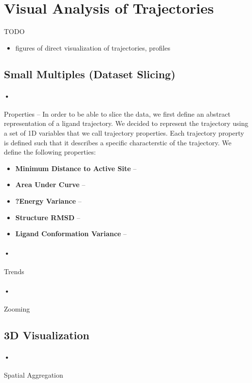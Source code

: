 \documentclass{vgtc}                          %
\begin{document}
\section{Visual Analysis of Trajectories}

TODO
\begin{itemize}
  \item figures of direct visualization of trajectories, profiles
\end{itemize}

\subsection{Small Multiples (Dataset Slicing)}

\paragraph{•} Properties -- In order to be able to slice the data, we first define an abstract representation of a ligand trajectory.
We decided to represent the trajectory using a set of 1D variables that we call trajectory properties.
Each trajectory property is defined such that it describes a specific characterstic of the trajectory.
We define the following properties:
\begin{itemize}
  \item \textbf{Minimum Distance to Active Site} --
  \item \textbf{Area Under Curve} --
  \item \textbf{?Energy Variance} --
  \item \textbf{Structure RMSD} --
  \item \textbf{Ligand Conformation Variance} --
\end{itemize}

\paragraph{•} Trends

\paragraph{•} Zooming

\subsection{3D Visualization}

\paragraph{•} Spatial Aggregation
\end{document}
